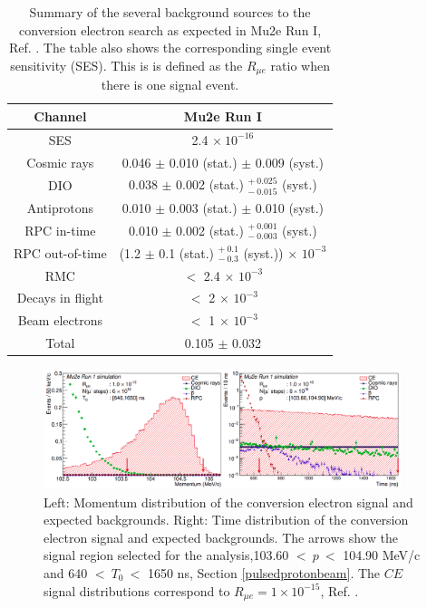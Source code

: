 \begin{center}  
\begin{table}[!h]
\centering
\renewcommand{\arraystretch}{1.2}
\begin{tabular}{| c | c |}
\hline
\textbf{Channel} & \textbf{Mu2e Run I}\\
\hline
SES & 2.4 $\times \ 10^{-16}$ \\
\hline
Cosmic rays & 0.046 $\pm$ 0.010 (stat.) $\pm$ 0.009 (syst.) \\
DIO & 0.038 $\pm$ 0.002 (stat.) $ ^{+ \ 0.025} _{- \ 0.015}$ (syst.)\\
Antiprotons & 0.010 $\pm$ 0.003 (stat.) $\pm$ 0.010 (syst.) \\
RPC in-time & 0.010 $\pm$ 0.002 (stat.) $ ^{+ \ 0.001} _{- \ 0.003}$ (syst.)\\
RPC out-of-time & (1.2 $\pm$ 0.1  (stat.) $ ^{+ \ 0.1} _{- \ 0.3}$ (syst.)) $\times$ $10^{-3}$ \\
RMC & $<$ 2.4 $\times$ $10^{-3}$ \\
Decays in flight & $<$ 2 $\times$ $10^{-3}$ \\
Beam electrons & $<$ 1 $\times$ $10^{-3}$ \\
\hline
Total &  0.105 $\pm$ 0.032\\
\hline
\end{tabular}
\caption{Summary of the several background sources to the conversion electron search as expected in Mu2e Run I,  Ref. \cite{universe9010054}. The table also shows the corresponding single event sensitivity (SES). This is is defined as the $R_{\mu e}$ ratio when there is one signal event.}
\end{table}\label{tab:summarybkg}
\end{center}
\begin{figure}[!h]
\centering
\includegraphics[width =0.93\textwidth]{figures/png/Screenshot_20240225_102708.png}
\caption{Left: Momentum distribution of the conversion electron signal and expected backgrounds. Right: Time distribution of the conversion electron signal and expected backgrounds. The arrows show the signal region selected for the analysis,103.60 $< \ p \ < $ 104.90 MeV/c and 640 $< \ T_0 \ < $ 1650 ns, Section \ref{pulsedprotonbeam}. The $CE$ signal distributions correspond to $R_{\mu e} = 1 \times 10^{-15}$, Ref. \cite{universe9010054}.}
\label{fig:sensitivity}
\end{figure}
